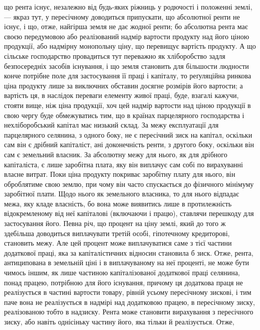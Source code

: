 \parcont{}  %
що рента існує, незалежно від будь-яких ріжниць у родючості і положенні
землі, — якраз тут, у пересічному доводиться припускати, що абсолютної ренти
не існує, і що, отже, найгірша земля не дає жодної ренти; бо абсолютна рента
має своєю передумовою або реалізований надмір вартости продукту над його ціною
продукції, або надмірну монопольну ціну, що перевищує вартість продукту. А що
сільське господарство провадиться тут переважно як хліборобство задля безпосередніх
засобів існування, і що земля становить для більшости людности
конче потрібне поле для застосування її праці і капіталу, то реґуляційна ринкова
ціна продукту лише за виключних обставин досягне розмірів його вартости;
а вартість ця, в наслідок переваги елементу живої праці, буде, взагалі кажучи,
стояти вище, ніж ціна продукції, хоч цей надмір вартости над ціною продукції
в свою чергу буде обмежуватись тим, що в країнах парцелярного господарства
і нехліборобський капітал має низький склад. За межу експлуатації для парцелярного
селянина, з одного боку, не є пересічний зиск на капітал, оскільки
сам він є дрібний капіталіст, ані доконечність ренти, з другого боку, оскільки
він сам є земельний власник. За абсолютну межу для нього, як для дрібного
капіталіста, є лише заробітна плата, яку він виплачує сам собі по вирахуванні
власне витрат. Поки ціна продукту покриває заробітну плату для нього, він
оброблятиме свою землю, при чому він часто спускається до фізичного мінімуму
заробітної плати. Щодо нього як земельного власника, то для нього відпадає
межа, яку кладе власність, бо вона може виявитись лише в протилежність
відокремленому від неї капіталові (включаючи і працю), ставлячи перешкоду для
застосування його. Певна річ, що процент на ціну землі, який до того ж здебільша
доводиться виплачувати третій особі, гіпотечному кредиторові, становить
межу. Але цей процент може виплачуватися саме з тієї частини додаткової
праці, яка за капіталістичних відносин становила б зиск. Отже, рента, антиципована
в земельній ціні і в виплачуваному на неї проценті, не може бути чимось
іншим, як лише частиною капіталізованої додаткової праці селянина, понад
працею, потрібною для його існування, причому ця додаткова праця не реалізується
в частині вартости товару, рівній усьому пересічному зискові, і тим
паче вона не реалізується в надмірі над додатковою працею, в пересічному зиску,
реалізованою тобто в надзиску. Рента може становити вирахування з пересічного
зиску, або навіть однісіньку частину його, яка тільки й реалізується. Отже,
